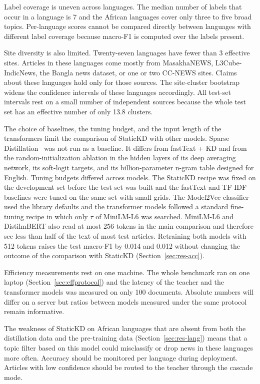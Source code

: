\documentclass{ieeeaccess}
\begin{document}
Label coverage is uneven across languages. The median number of labels that occur in a language is 7 and the African languages cover only three to five broad topics. Per-language scores cannot be compared directly between languages with different label coverage because macro-F1 is computed over the labels present.

Site diversity is also limited. Twenty-seven languages have fewer than 3 effective sites. Articles in these languages come mostly from MasakhaNEWS, L3Cube-IndicNews, the Bangla news dataset, or one or two CC-NEWS sites. Claims about these languages hold only for those sources. The site-cluster bootstrap widens the confidence intervals of these languages accordingly. All test-set intervals rest on a small number of independent sources because the whole test set has an effective number of only 13.8 clusters.

The choice of baselines, the tuning budget, and the input length of the transformers limit the comparison of StaticKD with other models. Sparse Distillation~\cite{ye2022sparse} was not run as a baseline. It differs from fastText + KD and from the random-initialization ablation in the hidden layers of its deep averaging network, its soft-logit targets, and its billion-parameter n-gram table designed for English. Tuning budgets differed across models. The StaticKD recipe was fixed on the development set before the test set was built and the fastText and TF-IDF baselines were tuned on the same set with small grids. The Model2Vec classifier used the library defaults and the transformer models followed a standard fine-tuning recipe in which only $\tau$ of MiniLM-L6 was searched. MiniLM-L6 and DistilmBERT also read at most 256 tokens in the main comparison and therefore see less than half of the text of most test articles. Retraining both models with 512 tokens raises the test macro-F1 by 0.014 and 0.012 without changing the outcome of the comparison with StaticKD (Section~\ref{sec:res-acc}).

Efficiency measurements rest on one machine. The whole benchmark ran on one laptop (Section~\ref{sec:effprotocol}) and the latency of the teacher and the transformer models was measured on only 100 documents. Absolute numbers will differ on a server but ratios between models measured under the same protocol remain informative.

The weakness of StaticKD on African languages that are absent from both the distillation data and the pre-training data (Section~\ref{sec:res-lang}) means that a topic filter based on this model could misclassify or drop news in these languages more often. Accuracy should be monitored per language during deployment. Articles with low confidence should be routed to the teacher through the cascade mode.
\end{document}
